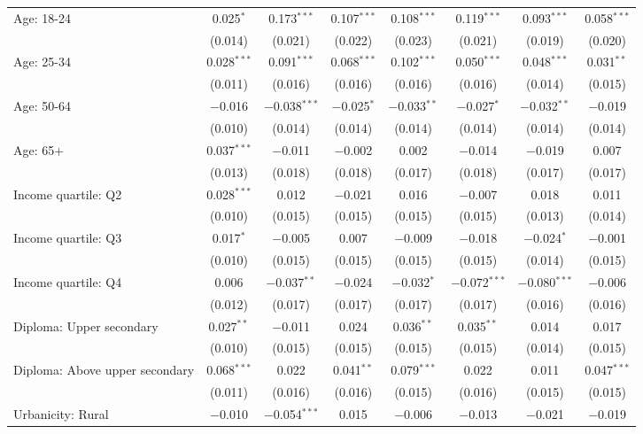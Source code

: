 \begin{tabular}{@{\extracolsep{5pt}}lccccccc}
  Age: 18\mbox{-}24 & 0.025$^{*}$ & 0.173$^{***}$ & 0.107$^{***}$ & 0.108$^{***}$ & 0.119$^{***}$ & 0.093$^{***}$ & 0.058$^{***}$ \\ 
  & (0.014) & (0.021) & (0.022) & (0.023) & (0.021) & (0.019) & (0.020) \\ 
  Age: 25\mbox{-}34 & 0.028$^{***}$ & 0.091$^{***}$ & 0.068$^{***}$ & 0.102$^{***}$ & 0.050$^{***}$ & 0.048$^{***}$ & 0.031$^{**}$ \\ 
  & (0.011) & (0.016) & (0.016) & (0.016) & (0.016) & (0.014) & (0.015) \\ 
  Age: 50\mbox{-}64 & $-$0.016 & $-$0.038$^{***}$ & $-$0.025$^{*}$ & $-$0.033$^{**}$ & $-$0.027$^{*}$ & $-$0.032$^{**}$ & $-$0.019 \\ 
  & (0.010) & (0.014) & (0.014) & (0.014) & (0.014) & (0.014) & (0.014) \\ 
  Age: 65+ & 0.037$^{***}$ & $-$0.011 & $-$0.002 & 0.002 & $-$0.014 & $-$0.019 & 0.007 \\ 
  & (0.013) & (0.018) & (0.018) & (0.017) & (0.018) & (0.017) & (0.017) \\ 
  Income quartile: Q2 & 0.028$^{***}$ & 0.012 & $-$0.021 & 0.016 & $-$0.007 & 0.018 & 0.011 \\ 
  & (0.010) & (0.015) & (0.015) & (0.015) & (0.015) & (0.013) & (0.014) \\ 
  Income quartile: Q3 & 0.017$^{*}$ & $-$0.005 & 0.007 & $-$0.009 & $-$0.018 & $-$0.024$^{*}$ & $-$0.001 \\ 
  & (0.010) & (0.015) & (0.015) & (0.015) & (0.015) & (0.014) & (0.015) \\ 
  Income quartile: Q4 & 0.006 & $-$0.037$^{**}$ & $-$0.024 & $-$0.032$^{*}$ & $-$0.072$^{***}$ & $-$0.080$^{***}$ & $-$0.006 \\ 
  & (0.012) & (0.017) & (0.017) & (0.017) & (0.017) & (0.016) & (0.016) \\ 
  Diploma: Upper secondary & 0.027$^{**}$ & $-$0.011 & 0.024 & 0.036$^{**}$ & 0.035$^{**}$ & 0.014 & 0.017 \\ 
  & (0.010) & (0.015) & (0.015) & (0.015) & (0.015) & (0.014) & (0.015) \\ 
  Diploma: Above upper secondary & 0.068$^{***}$ & 0.022 & 0.041$^{**}$ & 0.079$^{***}$ & 0.022 & 0.011 & 0.047$^{***}$ \\ 
  & (0.011) & (0.016) & (0.016) & (0.015) & (0.016) & (0.015) & (0.015) \\ 
  Urbanicity: Rural & $-$0.010 & $-$0.054$^{***}$ & 0.015 & $-$0.006 & $-$0.013 & $-$0.021 & $-$0.019 \\ 

\end{tabular}
